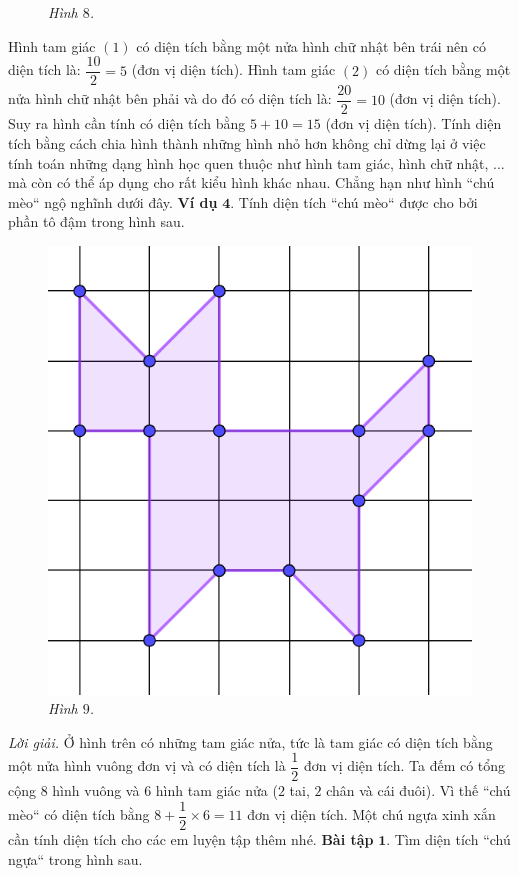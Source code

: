 \begin{multicols}{2}
\begin{figure}[H]
		\caption{\small\textit{\color{toancuabi}Hình $8$.}}
		\vspace*{-5pt}
	\end{figure}
	Hình tam giác $(1)$ có diện tích bằng một nửa hình chữ nhật bên trái nên có diện tích là: $\dfrac{10}{2}=5$ (đơn vị diện tích).
	\vskip 0.1cm
	Hình tam giác $(2)$ có diện tích bằng một nửa hình chữ nhật bên phải và do đó có diện tích là: $\dfrac{20}{2}=10$ (đơn vị diện tích).
	\vskip 0.1cm
	Suy ra hình cần tính có diện tích bằng $5+10=15$ (đơn vị diện tích). 
	\vskip 0.1cm
	Tính diện tích bằng cách chia hình thành những hình nhỏ hơn không chỉ dừng lại ở việc tính toán những dạng hình học quen thuộc như hình tam giác, hình chữ nhật, ... mà còn có thể áp dụng cho rất kiểu hình khác nhau. Chẳng hạn như hình ``chú mèo`` ngộ nghĩnh dưới đây.  
	\vskip 0.1cm
	\textbf{\color{toancuabi}Ví dụ} $\pmb{4.}$ Tính diện tích ``chú mèo`` được cho bởi phần tô đậm trong hình sau.
	\begin{figure}[H]
		\centering
		\vspace*{-5pt}
		\captionsetup{labelformat= empty, justification=centering}
		\includegraphics[width=0.45\linewidth]{9}
		\caption{\small\textit{\color{toancuabi}Hình $9$.}}
		\vspace*{-10pt}
	\end{figure}
	\textit{Lời giải.} Ở hình trên có những tam giác nửa, tức là tam giác có diện tích bằng một nửa hình vuông đơn vị và có diện tích là $\dfrac{1}{2}$ đơn vị diện tích. Ta đếm có tổng cộng $8$ hình vuông và $6$ hình tam giác nửa ($2$ tai, $2$ chân và cái đuôi). Vì thế ``chú mèo`` có diện tích bằng $8+\dfrac{1}{2}\times 6=11$ đơn vị diện tích.
	\vskip 0.1cm
	Một chú ngựa xinh xắn cần tính diện tích cho các em luyện tập thêm nhé.
	\vskip 0.1cm
	\textbf{\color{toancuabi}Bài tập} $\pmb{1.}$ Tìm diện tích ``chú ngựa`` trong hình sau.
	\begin{figure}[H]
		\centering
		\vspace*{5pt}

\end{figure}
\end{multicols}

